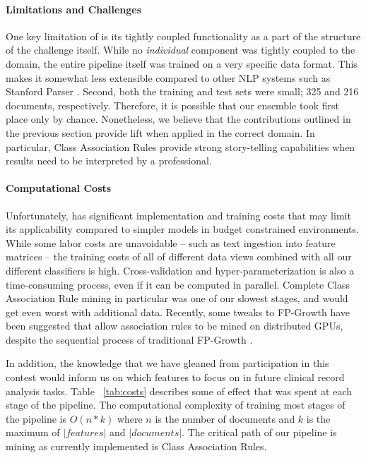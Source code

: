 
\paragraph{Limitations and Challenges} One key limitation of \CREATE is its tightly coupled functionality as a part of the structure of the challenge itself. While no \textit{individual} component was tightly coupled to the domain, the entire pipeline itself was trained on a very specific data format. This makes it somewhat less extensible compared to other NLP systems such as Stanford Parser \cite{stanfordparser}. Second, both the training and test sets were small; 325 and 216 documents, respectively. Therefore, it is possible that our ensemble took first place only by chance. Nonetheless, we believe that the contributions outlined in the previous section provide lift when applied in the correct domain. In particular, Class Association Rules provide strong story-telling capabilities when results need to be interpreted by a professional.

\paragraph{Computational Costs} Unfortunately, \CREATE has significant implementation and training costs that may limit its applicability compared to simpler models in budget constrained environments. While some labor costs are unavoidable -- such as text ingestion into feature matrices -- the training costs of all of different data views combined with all our different classifiers is high. Cross-validation and hyper-parameterization is also a time-consuming process, even if it can be computed in parallel. Complete Class Association Rule mining in particular was one of our slowest stages, and would get even worst with additional data. Recently, some tweaks to FP-Growth have been suggested that allow association rules to be mined on distributed GPUs, despite the sequential process of traditional FP-Growth \cite{7022712}. 

In addition, the knowledge that we have gleaned from participation in this contest would inform us on which features to focus on in future clinical record analysis tasks. Table ~\ref{tab:costs} describes some of effect that was spent at each stage of the pipeline. The computational complexity of training most stages of the pipeline is $O(n * k)$ where $n$ is the number of documents and $k$ is the maximum of $|features|$ and $|documents|$. The critical path of our pipeline is mining as currently implemented is Class Association Rules.

